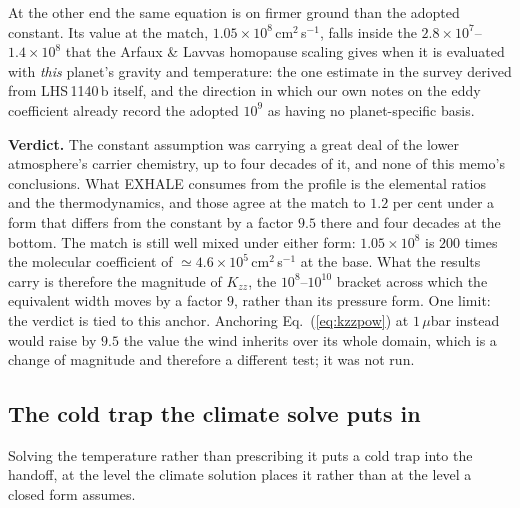 \documentclass[english,a4paper]{my_memo}
\begin{document}
At the other end the same equation is on firmer ground than the adopted
constant. Its value at the match, $1.05\times10^{8}$\,cm$^2$\,s$^{-1}$, falls
inside the $2.8\times10^{7}$--$1.4\times10^{8}$ that the Arfaux \& Lavvas
homopause scaling gives when it is evaluated with \emph{this} planet's
gravity and temperature: the one estimate in the survey derived from
LHS\,1140\,b itself, and the direction in which our own notes on the eddy
coefficient already record the adopted $10^{9}$ as having no planet-specific
basis.

\medskip
\noindent\textbf{Verdict.} The constant assumption was carrying a great deal
of the lower atmosphere's carrier chemistry, up to four decades of it, and
none of this memo's conclusions. What EXHALE consumes from the profile is the
elemental ratios and the thermodynamics, and those agree at the match to
$1.2$ per cent under a form that differs from the constant by a factor $9.5$
there and four decades at the bottom. The match is still well mixed under
either form: $1.05\times10^{8}$ is $200$ times the molecular coefficient of
$\simeq 4.6\times10^{5}$\,cm$^2$\,s$^{-1}$ at the base. What the results
carry is therefore the magnitude of $K_{zz}$, the $10^{8}$--$10^{10}$ bracket
across which the equivalent width moves by a factor $9$, rather than its
pressure form. One limit: the verdict is tied to this anchor. Anchoring
Eq.~(\ref{eq:kzzpow}) at $1\,\mu$bar instead would raise by $9.5$ the value
the wind inherits over its whole domain, which is a change of magnitude and
therefore a different test; it was not run.
\subsection{The cold trap the climate solve puts in}

Solving the temperature rather than prescribing it puts a cold trap into the
handoff, at the level the climate solution places it rather than at the level
a closed form assumes.
\end{document}
